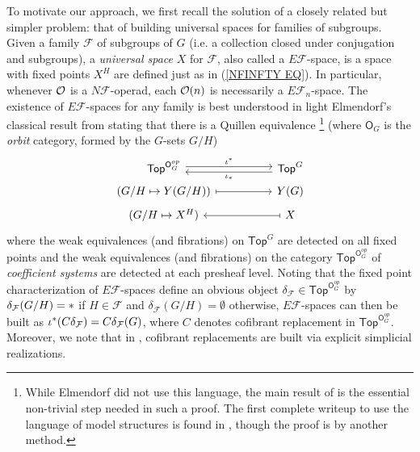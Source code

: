 \documentclass[a4paper,10pt]{article}%
\begin{document}
To motivate our approach, we first recall the solution of a closely related but simpler problem: that of building universal spaces for families of subgroups. 
Given a family $\mathcal{F}$ of subgroups of $G$ 
(i.e. a collection closed under conjugation and subgroups), a \textit{universal space} $X$ for $\mathcal{F}$, 
also called a $E \mathcal{F}$-space,
is a space with fixed points $X^H$ are defined just as in (\ref{NFINFTY EQ}).
In particular, whenever $\mathcal{O}$ is a $N \mathcal{F}$-operad, 
each $\mathcal{O}(n)$ is necessarily a $E \mathcal{F}_n$-space.
The existence of $E \mathcal{F}$-spaces for any family is 
best understood in light Elmendorf's classical result from \cite{Elm83}
stating that there is a Quillen equivalence 
\footnote{While Elmendorf did not use this language, the main result of \cite{Elm83} is the essential non-trivial step needed in such a proof. The first complete writeup to use the language of model structures is found in \cite{Pia91}, though the proof is by another method.}
(where $\mathsf{O}_G$ is the \textit{orbit} category, formed by the $G$-sets $G/H$)
\begin{equation}\label{COFADJINT EQ}
\begin{tikzcd}[column sep =5em,row sep=0.3em]
	\mathsf{Top}^{\mathsf{O}_G^{op}}
	\ar[shift left=1]{r}{\iota^{\**}} 
&
	\mathsf{Top}^G
	\ar[shift left=1]{l}{\iota_{\**}}
\\
	\left(G/H \mapsto Y(G/H)\right)  \ar[mapsto]{r}&
	Y(G)
\\
	(G/H \mapsto X^H) &
	X \ar[mapsto]{l}
\end{tikzcd}
\end{equation}
where the weak equivalences (and fibrations)
on $\mathsf{Top}^G$ are detected on all fixed points and
the weak equivalences (and fibrations)
on the category $\mathsf{Top}^{\mathsf{O}_G^{op}}$ of 
\textit{coefficient systems}
are detected at each presheaf level.
Noting that the fixed point characterization of $E \mathcal{F}$-spaces define an obvious object 
$\delta_{\mathcal{F}} \in \mathsf{Top}^{\mathsf{O}_G^{op}}$ by 
$\delta_{\mathcal{F}}(G/H)=\**$ if $H \in \mathcal{F}$ and
$\delta_{\mathcal{F}}(G/H)=\emptyset$ otherwise, 
$E \mathcal{F}$-spaces can then be built as
$\iota^{\**}(C \delta_{\mathcal{F}}) = 
C \delta_{\mathcal{F}}(G)$, where $C$ denotes cofibrant replacement in $\mathsf{Top}^{\mathsf{O}_G^{op}}$.
Moreover, we note that in \cite{Elm83}, cofibrant replacements are built via explicit simplicial realizations.
\end{document}
